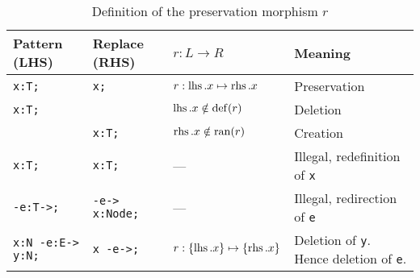 \begin{table}[htbp]
\centering
\begin{tabularx}{\linewidth}{lllX}
  \textbf{Pattern (LHS)} & \textbf{Replace (RHS)} & \textbf{$r: L \longrightarrow R$} & \textbf{Meaning} \\ \hline 
  \texttt{x:T;} & \texttt{x;}                 & $r:\operatorname{lhs}.x \mapsto \operatorname{rhs}.x$ & Preservation \\
  \texttt{x:T;} & \texttt{}                   & $\operatorname{lhs}.x \notin \operatorname{def}(r)$    & Deletion \\
  \texttt{} & \texttt{x:T;}                   & $\operatorname{rhs}.x \notin \operatorname{ran}(r)$    & Creation \\
  \texttt{x:T;} & \texttt{x:T;}               & --- & Illegal, redefinition of \texttt{x} \\
  \texttt{-e:T->;} & \texttt{-e-> x:Node;}    & --- & Illegal, redirection of  \texttt{e} \\
  \texttt{x:N -e:E-> y:N;} & \texttt{x -e->;} & $r:\{\operatorname{lhs}.x\} \mapsto \{\operatorname{rhs}.x\}$ & Deletion of \texttt{y}. Hence del\-etion of \texttt{e}. \\
\end{tabularx}
\caption{Definition of the preservation morphism $r$}
\label{rule:impldefinition}
\end{table}



